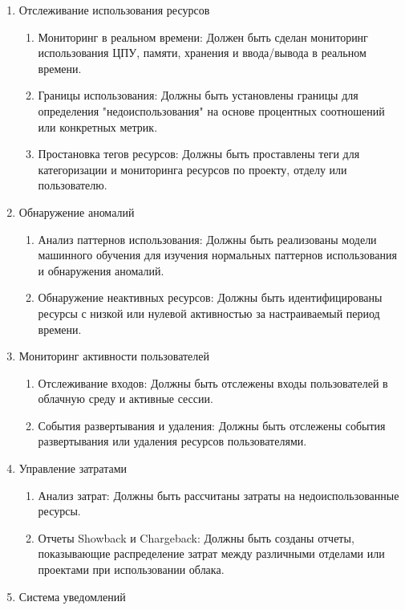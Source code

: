 \documentclass[14pt, a4paper]{extarticle}
\begin{document}
\begin{enumerate}
    \item Отслеживание использования ресурсов
    \begin{enumerate}
        \item Мониторинг в реальном времени: Должен быть сделан мониторинг использования ЦПУ, памяти, хранения и ввода/вывода в реальном времени.
        \item Границы использования: Должны быть установлены границы для определения "недоиспользования" на основе процентных соотношений или конкретных метрик.
        \item Простановка тегов ресурсов: Должны быть проставлены теги для категоризации и мониторинга ресурсов по проекту, отделу или пользователю.
    \end{enumerate}
    \item Обнаружение аномалий
    \begin{enumerate}
        \item Анализ паттернов использования: Должны быть реализованы модели машинного обучения для изучения нормальных паттернов использования и обнаружения аномалий.
        \item Обнаружение неактивных ресурсов: Должны быть идентифицированы ресурсы с низкой или нулевой активностью за настраиваемый период времени.
    \end{enumerate}
    \item Мониторинг активности пользователей
    \begin{enumerate}
        \item Отслеживание входов: Должны быть отслежены входы пользователей в облачную среду и активные сессии.
        \item События развертывания и удаления: Должны быть отслежены события развертывания или удаления ресурсов пользователями.
    \end{enumerate}
    \item Управление затратами
    \begin{enumerate}
        \item Анализ затрат: Должны быть рассчитаны затраты на недоиспользованные ресурсы.
        \item Отчеты Showback и Chargeback: Должны быть созданы отчеты, показывающие распределение затрат между различными отделами или проектами при использовании облака.
    \end{enumerate}
    \item Система уведомлений
    \begin{enumerate}

\end{enumerate}
\end{enumerate}
\end{document}
